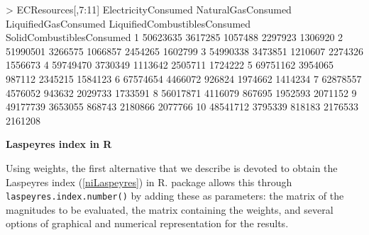\begin{example}[fontsize=\scriptsize]
> ECResources[,7:11]
   ElectricityConsumed NaturalGasConsumed LiquifiedGasConsumed LiquifiedCombustiblesConsumed SolidCombustiblesConsumed
1             50623635            3617285              1057488                       2297923                   1306920
2             51990501            3266575              1066857                       2454265                   1602799
3             54990338            3473851              1210607                       2274326                   1556673
4             59749470            3730349              1113642                       2505711                   1724222
5             69751162            3954065               987112                       2345215                   1584123
6             67574654            4466072               926824                       1974662                   1414234
7             62878557            4576052               943632                       2029733                   1733591
8             56017871            4116079               867695                       1952593                   2071152
9             49177739            3653055               868743                       2180866                   2077766
10            48541712            3795339               818183                       2176533                   2161208
\end{example}

\vspace*{0.15 cm}\noindent\textbf{Laspeyres index in R}

\noindent Using weights, the first alternative that we describe is devoted to obtain the Laspeyres index (\ref{niLaspeyres}) in R.  package allows this through \verb|laspeyres.index.number()| by adding these as parameters: the matrix of the magnitudes to be evaluated, the matrix containing the weights, and several options of graphical and numerical representation for the results.

